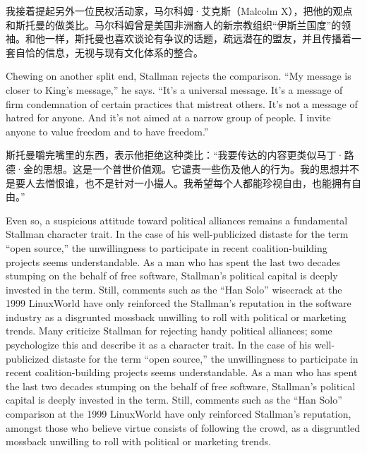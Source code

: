 \ifdefined\chs
我接着提起另外一位民权活动家，马尔科姆·艾克斯（Malcolm X），把他的观点和斯托曼的做类比。马尔科姆曾是美国非洲裔人的新宗教组织``伊斯兰国度''的领袖。和他一样，斯托曼也喜欢谈论有争议的话题，疏远潜在的盟友，并且传播着一套自恰的信息，无视与现有文化体系的整合。
\fi

\ifdefined\eng
Chewing on another split end, Stallman rejects the comparison. ``My message is closer to King's message,'' he says. ``It's a universal message. It's a message of firm condemnation of certain practices that mistreat others. It's not a message of hatred for anyone. And it's not aimed at a narrow group of people. I invite anyone to value freedom and to have freedom.''
\fi

\ifdefined\chs
斯托曼嚼完嘴里的东西，表示他拒绝这种类比：``我要传达的内容更类似马丁·路德·金的思想。这是一个普世价值观。它谴责一些伤及他人的行为。我的思想并不是要人去憎恨谁，也不是针对一小撮人。我希望每个人都能珍视自由，也能拥有自由。''
\fi

\ifdefined\eng
\ifdefined\vone
Even so, a suspicious attitude toward political alliances remains a fundamental Stallman character trait. In the case of his well-publicized distaste for the term ``open source,'' the unwillingness to participate in recent coalition-building projects seems understandable. As a man who has spent the last two decades stumping on the behalf of free software, Stallman's political capital is deeply invested in the term. Still, comments such as the ``Han Solo'' wisecrack at the 1999 LinuxWorld have only reinforced the Stallman's reputation in the software industry as a disgrunted mossback unwilling to roll with political or marketing trends.
\fi
\ifdefined\vtwo
Many criticize Stallman for rejecting handy political alliances; some psychologize this and describe it as a character trait. In the case of his well-publicized distaste for the term ``open source,'' the unwillingness to participate in recent coalition-building projects seems understandable. As a man who has spent the last two decades stumping on the behalf of free software, Stallman's political capital is deeply invested in the term. Still, comments such as the ``Han Solo'' comparison at the 1999 LinuxWorld have only reinforced Stallman's reputation, amongst those who believe virtue consists of following the crowd, as a disgruntled mossback unwilling to roll with political or marketing trends.
\fi
\fi


